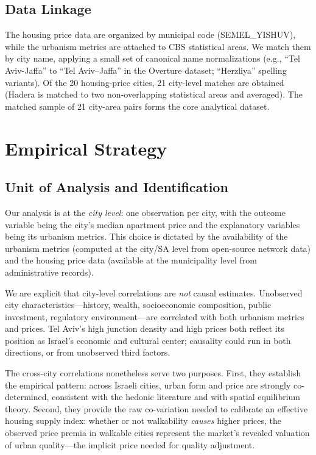 \documentclass[12pt,a4paper]{article}
\begin{document}
\subsection{Data Linkage}
\label{sec:data_linkage}

The housing price data are organized by municipal code (SEMEL\_YISHUV), while
the urbanism metrics are attached to CBS statistical areas.  We match them by
city name, applying a small set of canonical name normalizations (e.g., ``Tel
Aviv-Jaffa'' to ``Tel Aviv--Jaffa'' in the Overture dataset; ``Herzliya''
spelling variants).  Of the 20 housing-price cities, 21 city-level matches are
obtained (Hadera is matched to two non-overlapping statistical areas and
averaged).  The matched sample of 21 city-area pairs forms the core analytical
dataset.

\section{Empirical Strategy}
\label{sec:method}

\subsection{Unit of Analysis and Identification}
\label{sec:method_unit}

Our analysis is at the \textit{city level}: one observation per city, with the
outcome variable being the city's median apartment price and the explanatory
variables being its urbanism metrics.  This choice is dictated by the
availability of the urbanism metrics (computed at the city/SA level from
open-source network data) and the housing price data (available at the
municipality level from administrative records).

We are explicit that city-level correlations are \textit{not} causal estimates.
Unobserved city characteristics—history, wealth, socioeconomic composition,
public investment, regulatory environment—are correlated with both urbanism
metrics and prices.  Tel Aviv's high junction density and high prices both
reflect its position as Israel's economic and cultural center; causality could
run in both directions, or from unobserved third factors.

The cross-city correlations nonetheless serve two purposes.  First, they
establish the empirical pattern: across Israeli cities, urban form and price are
strongly co-determined, consistent with the hedonic literature and with spatial
equilibrium theory.  Second, they provide the raw co-variation needed to
calibrate an effective housing supply index: whether or not walkability
\textit{causes} higher prices, the observed price premia in walkable cities
represent the market's revealed valuation of urban quality—the implicit price
needed for quality adjustment.
\end{document}
